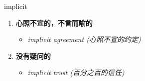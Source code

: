 
\begin{frame}
{\huge implicit}
\begin{center}
\begin{enumerate}\Large
  \item \textbf{心照不宣的，不言而喻的}
  \begin{itemize}
    \item \em{\Large{implicit agreement (心照不宣的约定)}}
  \end{itemize}
  \item \textbf{没有疑问的}
  \begin{itemize}
    \item \em{\Large{implicit trust (百分之百的信任)}}
  \end{itemize}
\end{enumerate}
\end{center}
\end{frame}
